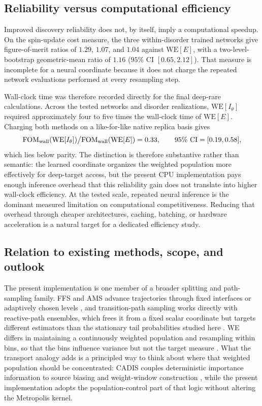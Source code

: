 \documentclass[a4paper,fleqn]{cas-sc}
\newcommand{\WE}{\mathrm{WE}}
\newcommand{\FOM}{\mathrm{FOM}}
\begin{document}
\subsection{Reliability versus computational efficiency}\label{sec:costdisc}
Improved discovery reliability does not, by itself, imply a computational speedup. On the
spin-update cost measure, the three within-disorder trained networks give figure-of-merit ratios
of $1.29$, $1.07$, and $1.04$ against $\WE[E]$, with a two-level-bootstrap geometric-mean ratio
of $1.16$ ($95\%$ CI $[0.65,2.12]$). That measure is incomplete for a neural coordinate because
it does not charge the repeated network evaluations performed at every resampling step.

Wall-clock time was therefore recorded directly for the final deep-rare calculations. Across
the tested networks and disorder realizations, $\WE[I_\theta]$ required approximately four to
five times the wall-clock time of $\WE[E]$. Charging both methods on a like-for-like native
replica basis gives
\begin{equation}
\FOM_{\rm wall}(\WE[I_\theta])\big/\FOM_{\rm wall}(\WE[E]) = 0.33,
\qquad 95\%\ \mathrm{CI}=[0.19,0.58],
\label{eq:fomwall}
\end{equation}
which lies below parity. The distinction is therefore substantive rather than semantic: the
learned coordinate organizes the weighted population more effectively for deep-target access,
but the present CPU implementation pays enough inference overhead that this reliability gain
does not translate into higher wall-clock efficiency. At the tested scale, repeated neural
inference is the dominant measured limitation on computational competitiveness. Reducing that
overhead through cheaper architectures, caching, batching, or hardware acceleration is a
natural target for a dedicated efficiency study.

\subsection{Relation to existing methods, scope, and outlook}\label{sec:relation}
The present implementation is one member of a broader splitting and path-sampling family.
FFS and AMS advance trajectories through fixed interfaces or adaptively chosen levels
\citep{allen2009,valeriani2007,cerou2007}, and transition-path sampling works directly with
reactive-path ensembles, which frees it from a fixed scalar coordinate but targets different
estimators than the stationary tail probabilities studied here
\citep{chandler1978,dellago1998,bolhuis2002}. WE differs in maintaining a continuously weighted
population and resampling within bins, so that the bins influence variance but not the target
measure \citep{huber1996,zhang2010,zuckerman2017}. What the transport analogy adds is a
principled way to think about where that weighted population should be concentrated: CADIS
couples deterministic importance information to source biasing and weight-window construction
\citep{wagner1998,haghighat2003,wagnerfw2014}, while the present implementation adopts the
population-control part of that logic without altering the Metropolis kernel.
\end{document}

